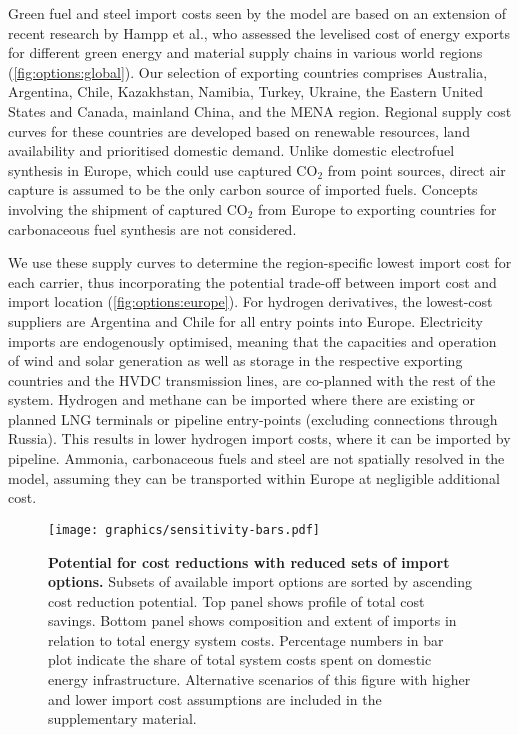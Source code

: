 \documentclass[5p,10pt]{elsarticle}
\begin{document}
Green fuel and steel import costs seen by the model are based on an extension of
recent research by Hampp et al.,\cite{hamppImportOptions2023} who assessed the
levelised cost of energy exports for different green energy and material supply
chains in various world regions (\cref{fig:options:global}). Our selection of
exporting countries comprises Australia, Argentina, Chile, Kazakhstan, Namibia,
Turkey, Ukraine, the Eastern United States and Canada, mainland China, and the
MENA region. Regional supply cost curves for these countries are developed based
on renewable resources, land availability and prioritised domestic demand.
Unlike domestic electrofuel synthesis in Europe, which could use captured CO$_2$
from point sources, direct air capture is assumed to be the only carbon source
of imported fuels. Concepts involving the shipment of captured CO$_2$
from Europe to exporting countries for carbonaceous fuel synthesis are not
considered.\cite{treeenergysolutionsGreenCycle2024,fonderSyntheticMethaneClosing2024}


We use these supply curves to determine the region-specific lowest import cost
for each carrier, thus incorporating the potential trade-off between import cost
and import location (\cref{fig:options:europe}). For hydrogen derivatives, the
lowest-cost suppliers are Argentina and Chile for all entry points into Europe.
Electricity imports are endogenously optimised, meaning that the capacities and
operation of wind and solar generation as well as storage in the respective
exporting countries and the HVDC transmission lines, are co-planned with the
rest of the system. Hydrogen and methane can be imported where there are
existing or planned LNG terminals or pipeline entry-points (excluding
connections through Russia). This results in lower hydrogen import costs, where
it can be imported by pipeline. Ammonia, carbonaceous fuels and steel are not
spatially resolved in the model, assuming they can be transported within Europe
at negligible additional cost.

\begin{figure*}
    \texttt{[image: graphics/sensitivity-bars.pdf]}
    \caption{\textbf{Potential for cost reductions with reduced sets of import options.}
        Subsets of available import options are sorted by ascending cost
        reduction potential. Top panel shows profile of total cost savings.
        Bottom panel shows composition and extent of imports in relation to
        total energy system costs. Percentage numbers in bar plot indicate the
        share of total system costs spent on domestic energy infrastructure.
        Alternative scenarios of this figure with higher and lower import cost
        assumptions are included in the supplementary material. }
    \label{fig:sensitivity-bars}
\end{figure*}
\end{document}
